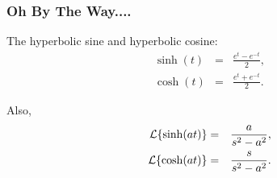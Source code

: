 \begin{frame}
  \frametitle{Oh By The Way....}

  \begin{definition}
    The hyperbolic sine and hyperbolic cosine:
    \begin{eqnarray*}
      \sinh(t) & = & \frac{e^t-e^{-t}}{2}, \\
      \cosh(t) & = & \frac{e^t+e^{-t}}{2}.
    \end{eqnarray*}
  \end{definition}

  {
    Also,
    \begin{eqnarray*}
      \laplace{\sinh(at)} & = & \frac{a}{s^2-a^2}, \\
      \laplace{\cosh(at)} & = & \frac{s}{s^2-a^2}.
    \end{eqnarray*}
  }

  
\end{frame}



